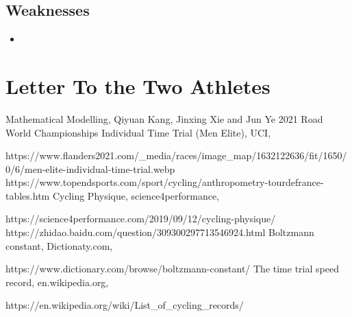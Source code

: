 \documentclass{article}
\begin{document}
		\subsection*{Weaknesses}

			\begin{itemize}
				\item
			\end{itemize}
	\newpage
	\section{Letter To the Two Athletes}
	\newpage
	\thispagestyle{empty}
	\renewcommand\refname{References}
	\clearpage
	\begin{thebibliography}{100}
		 Mathematical Modelling, Qiyuan Kang, Jinxing Xie and Jun Ye
		2021 Road World Championships Individual Time Trial (Men Elite), UCI,

		https://www.flanders2021.com/\_media/races/image\_map/1632122636/fit/1650/0/6/men-elite-individual-time-trial.webp
		https://www.topendsports.com/sport/cycling/anthropometry-tourdefrance-tables.htm
		Cycling Physique, science4performance,

		https://science4performance.com/2019/09/12/cycling-physique/
		https://zhidao.baidu.com/question/309300297713546924.html
		Boltzmann constant, Dictionaty.com,

		https://www.dictionary.com/browse/boltzmann-constant/
		The time trial speed record, en.wikipedia.org,

		https://en.wikipedia.org/wiki/List\_of\_cycling\_records/
	\end{thebibliography}
\end{document}
